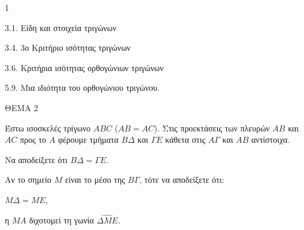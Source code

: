 \begin{ylh}{1}
    \item 3.1. Είδη και στοιχεία τριγώνων
    \item 3.4. 3ο Κριτήριο ισότητας τριγώνων
    \item 3.6. Κριτήρια ισότητας ορθογώνιων τριγώνων
    \item 5.9. Μια ιδιότητα του ορθογώνιου τριγώνου.
\end{ylh}

ΘΕΜΑ 2

Έστω ισοσκελές τρίγωνο $ABC$ ($AB = AC$). Στις προεκτάσεις των πλευρών $AB$ και $AC$ προς το $A$ φέρουμε τμήματα $B\Delta$ και $\Gamma E$ κάθετα στις $A\Gamma$ και $AB$ αντίστοιχα.

\begin{alist}
\item Να αποδείξετε ότι $B\Delta = \Gamma E$. 
\item Αν το σημείο $M$ είναι το μέσο της $B\Gamma$, τότε να αποδείξετε ότι:
\begin{alist}
\item $M\Delta = ME$, 
\item η $MA$ διχοτομεί τη γωνία $\widehat{\Delta ME}$. 
\end{alist}

\begin{center}
\end{center}
\end{alist}
